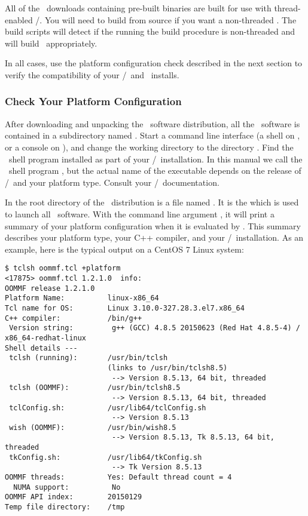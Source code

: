 All of the \OOMMF\ downloads containing pre-built binaries are built for
use with thread-enabled \Tcl/\Tk.  You will need to build from source if
you want a non-threaded \OOMMF.  The build scripts will detect if the
 running the build procedure is non-threaded and will build
\OOMMF\ appropriately.

In all cases, use the platform configuration check described in the next
section to verify the compatibility of your \Tcl/\Tk\ and \OOMMF\
installs.

\subsubsection{Check Your Platform Configuration}
\label{sec:platform.configuration}

After downloading and unpacking the \OOMMF\ software distribution, all
the \OOMMF\ software is contained in a subdirectory named \fn{oommf}.
Start a command line interface (a shell on \Unix, or a console
on \Windows), and change the 
working directory to the 
directory .  
Find the \Tcl\ shell program installed as part of your \Tcl/\Tk\ 
installation.  In this manual we call the \Tcl\ shell program
\fn{tclsh}, but the actual name of the executable depends
on the release of \Tcl/\Tk\ and your platform type.  Consult
your \Tcl/\Tk\ documentation.

In the root directory of the \OOMMF\ distribution is a file
named .  It is the 
which is used to launch all \OOMMF\ software.  With the command line
argument \cd{+platform}, 
it will print a summary of your
platform configuration when it is evaluated by .
This summary describes your platform type, your C++ compiler,
and your \Tcl/\Tk\ installation.  As an example, 
here is the typical output on a CentOS 7 Linux system:
\begin{verbatim}
$ tclsh oommf.tcl +platform
<17875> oommf.tcl 1.2.1.0  info:
OOMMF release 1.2.1.0
Platform Name:          linux-x86_64
Tcl name for OS:        Linux 3.10.0-327.28.3.el7.x86_64
C++ compiler:           /bin/g++ 
 Version string:         g++ (GCC) 4.8.5 20150623 (Red Hat 4.8.5-4) / x86_64-redhat-linux
Shell details ---
 tclsh (running):       /usr/bin/tclsh
                        (links to /usr/bin/tclsh8.5)
                         --> Version 8.5.13, 64 bit, threaded
 tclsh (OOMMF):         /usr/bin/tclsh8.5
                         --> Version 8.5.13, 64 bit, threaded
 tclConfig.sh:          /usr/lib64/tclConfig.sh
                         --> Version 8.5.13
 wish (OOMMF):          /usr/bin/wish8.5
                         --> Version 8.5.13, Tk 8.5.13, 64 bit, threaded
 tkConfig.sh:           /usr/lib64/tkConfig.sh
                         --> Tk Version 8.5.13
OOMMF threads:          Yes: Default thread count = 4
  NUMA support:          No
OOMMF API index:        20150129
Temp file directory:    /tmp
\end{verbatim}

